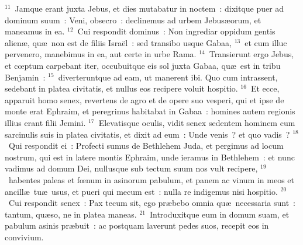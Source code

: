 ${}^{11}$~Jamque erant juxta Jebus, et dies mutabatur in noctem~: dixitque puer ad dominum suum~: Veni, obsecro~: declinemus ad urbem Jebus\ae orum, et maneamus in ea.
${}^{12}$~Cui respondit dominus~: Non ingrediar oppidum gentis alien\ae , qu\ae\ non est de filiis Isra\"el~: sed transibo usque Gabaa,
${}^{13}$~et cum illuc pervenero, manebimus in ea, aut certe in urbe Rama.
${}^{14}$~Transierunt ergo Jebus, et cœptum carpebant iter, occubuitque eis sol juxta Gabaa, qu\ae\ est in tribu Benjamin~:
${}^{15}$~diverteruntque ad eam, ut manerent ibi. Quo cum intrassent, sedebant in platea civitatis, et nullus eos recipere voluit hospitio.
${}^{16}$~Et ecce, apparuit homo senex, revertens de agro et de opere suo vesperi, qui et ipse de monte erat Ephraim, et peregrinus habitabat in Gabaa~: homines autem regionis illius erant filii Jemini.
${}^{17}$~Elevatisque oculis, vidit senex sedentem hominem cum sarcinulis suis in platea civitatis, et dixit ad eum~: Unde venis~? et quo vadis~?
${}^{18}$~Qui respondit ei~: Profecti sumus de Bethlehem Juda, et pergimus ad locum nostrum, qui est in latere montis Ephraim, unde ieramus in Bethlehem~: et nunc vadimus ad domum Dei, nullusque sub tectum suum nos vult recipere,
${}^{19}$~habentes paleas et fœnum in asinorum pabulum, et panem ac vinum in meos et ancill\ae\ tu\ae\ usus, et pueri qui mecum est~: nulla re indigemus nisi hospitio.
${}^{20}$~Cui respondit senex~: Pax tecum sit, ego pr\ae bebo omnia qu\ae\ necessaria sunt~: tantum, qu\ae so, ne in platea maneas.
${}^{21}$~Introduxitque eum in domum suam, et pabulum asinis pr\ae buit~: ac postquam laverunt pedes suos, recepit eos in convivium.


